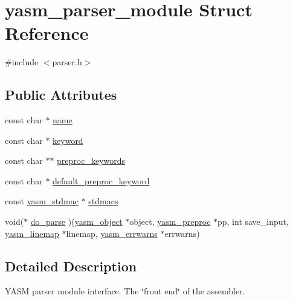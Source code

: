 \hypertarget{structyasm__parser__module}{\section{yasm\-\_\-parser\-\_\-module Struct Reference}
\label{structyasm__parser__module}
}


{\ttfamily \#include $<$parser.\-h$>$}

\subsection*{Public Attributes}
\begin{DoxyCompactItemize}
\item 
const char $\ast$ \hyperlink{structyasm__parser__module_aa8c8365a65281bb5176d1132112face5}{name}
\item 
const char $\ast$ \hyperlink{structyasm__parser__module_aeea6ef097cba295b8235754845fabf33}{keyword}
\item 
const char $\ast$$\ast$ \hyperlink{structyasm__parser__module_a6c6c5f67b090162a47bc914e0e1aa90d}{preproc\-\_\-keywords}
\item 
const char $\ast$ \hyperlink{structyasm__parser__module_ab0f565359c5ebc2ddb7ee1c1278a08ff}{default\-\_\-preproc\-\_\-keyword}
\item 
const \hyperlink{structyasm__stdmac}{yasm\-\_\-stdmac} $\ast$ \hyperlink{structyasm__parser__module_a6fc03a541552e7182b3027bd559e16f0}{stdmacs}
\item 
void($\ast$ \hyperlink{structyasm__parser__module_abf65b7952b4729636595b4565b62b7bb}{do\-\_\-parse} )(\hyperlink{structyasm__object}{yasm\-\_\-object} $\ast$object, \hyperlink{coretype_8h_aa84094d121bb4afca049e6c35efc2c92}{yasm\-\_\-preproc} $\ast$pp, int save\-\_\-input, \hyperlink{structyasm__linemap}{yasm\-\_\-linemap} $\ast$linemap, \hyperlink{structyasm__errwarns}{yasm\-\_\-errwarns} $\ast$errwarns)
\end{DoxyCompactItemize}


\subsection{Detailed Description}
Y\-A\-S\-M parser module interface. The \char`\"{}front end\char`\"{} of the assembler. 

